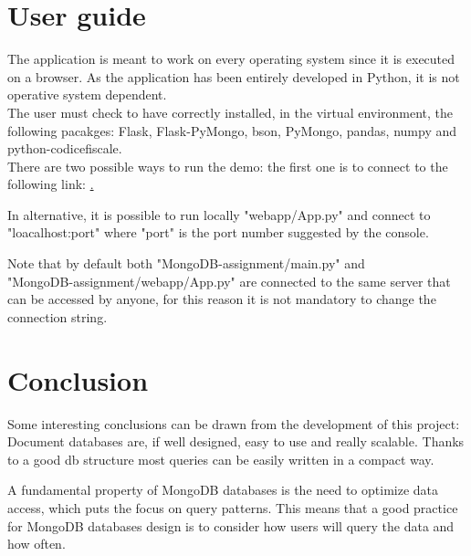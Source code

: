 \documentclass{article}
\begin{document}
\newpage

\section{User guide}
The application is meant to work on every operating system since it is executed on a browser. As the application has been entirely developed in Python, it is not operative system dependent.
\\The user must check to have correctly installed, in the virtual environment, the following pacakges: {\selectfont Flask, Flask-PyMongo, bson, PyMongo, pandas, numpy and python-codicefiscale}.
\hfill\break
\\There are two possible ways to run the demo: the first one is to connect to the following link: \href{https://c19-cert-viewer.herokuapp.com/}.

In alternative, it is possible to run locally {\selectfont"webapp/App.py"} and connect to {\selectfont"loacalhost:port"} where {\selectfont"port"} is the port number suggested by the console.

Note that by default both {\selectfont"MongoDB-assignment/main.py"} and
\\{\selectfont"MongoDB-assignment/webapp/App.py"} are connected to the same server that can be accessed by anyone, for this reason it is not mandatory to change the connection string.
\section{Conclusion}

Some interesting conclusions can be drawn from the development of this project: Document databases are, if well designed, easy to use and really scalable. Thanks to a good db structure most queries can be easily written in a compact way.

A fundamental property of MongoDB databases is the need to optimize data access, which puts the focus on query patterns. This means that a good practice for MongoDB databases design is to consider how users will query the data and how often.
\end{document}
